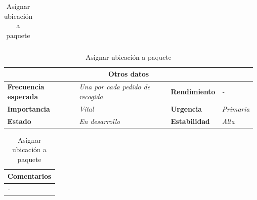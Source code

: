 \documentclass[12pt,spanish]{article}
\begin{document}
\begin{table}[H]
\begin{tabular}{|m{5pt}|m{15.5cm}|}
	\end{tabular}

	
	\vspace{0.5cm}
	
	\begin{tabular}{|m{3.75cm}|m{3.75cm}|m{3.75cm}|m{3.8cm}|}
		\hline
		\multicolumn{4}{|c|}{\textbf{Otros datos}} \\
		\hline
		\textbf{Frecuencia esperada} & \textit{Una por cada pedido de recogida} & \textbf{Rendimiento} & \textit{-} \\
		\hline
		\textbf{Importancia} & \textit{Vital} & \textbf{Urgencia} & \textit{Primaria} \\
		\hline
		\textbf{Estado} & \textit{En desarrollo} & \textbf{Estabilidad} & \textit{Alta} \\
		\hline
	\end{tabular}
	
	\vspace{1cm}
	
	\begin{tabular}{|m{16.2cm}|}
		\hline
		\textbf{Comentarios} \\
		\hline
		\textit{-} \\
		\hline
	\end{tabular}
	
	\caption{Asignar ubicación a paquete}

\end{table}
\end{document}
